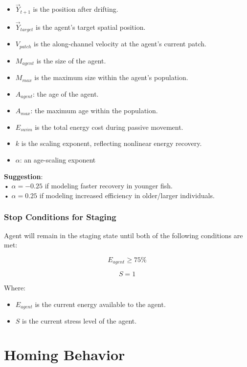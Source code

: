\documentclass[
]{book}
\begin{document}
\begin{itemize}
\item
  \(\vec{Y}_{t+1}\) is the position after drifting.
\item
  \(\vec{Y}_{target}\) is the agent's target spatial position.
\item
  \(V_{patch}\) is the along-channel velocity at the agent's current patch.
\item
  \(M_{agent}\) is the size of the agent.
\item
  \(M_{max}\) is the maximum size within the agent's population.
\item
  \(A_{agent}\): the age of the agent.
\item
  \(A_{max}\): the maximum age within the population.
\item
  \(E_{swim}\) is the total energy cost during passive movement.
\item
  \(k\) is the scaling exponent, reflecting nonlinear energy recovery.
\item
  \(\alpha\): an age-scaling exponent
\end{itemize}

\textbf{Suggestion}:\\

• \(\alpha = -0.25\) if modeling faster recovery in younger fish.\\

• \(\alpha = 0.25\) if modeling increased efficiency in older/larger individuals.

\subsection{Stop Conditions for Staging}\label{stop-conditions-for-staging}

Agent will remain in the staging state until both of the following conditions are met:

\[
E_{agent} \geq 75 \%
\]

\[
S = 1
\]

Where:

\begin{itemize}
\item
  \(E_{agent}\) is the current energy available to the agent.
\item
  \(S\) is the current stress level of the agent.
\end{itemize}

\chapter{Homing Behavior}\label{homing-behavior}
\end{document}
